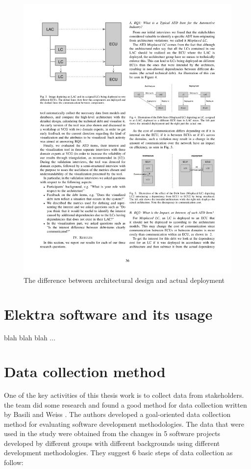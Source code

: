 \begin{figure}[H]
\centering
\captionsetup{justification=centering}
\vspace{0cm}%
\includegraphics[width=0.7\linewidth]{figure/literatures/eliasson_atd.pdf}
\caption{The difference between architectural design and actual deployment \cite{Eliasson_2}}
\label{fig:eliasson_atd}
\end{figure}


\section{Elektra software and its usage}
blah blah blah ... \todo{[to be filled in]}

\section{Data collection method}
One of the key activities of this thesis work is to collect data from stakeholders. the team did some research and found a good method for data collection written by Basili and Weiss \cite{Basili}. The authors developed a goal-oriented data collection method for evaluating software development methodologies. The data that were used in the study were obtained from the changes in 5 software projects developed by different groups with different backgrounds using different development methodologies. They suggest 6 basic steps of data collection as follow:\\[0.1cm]


